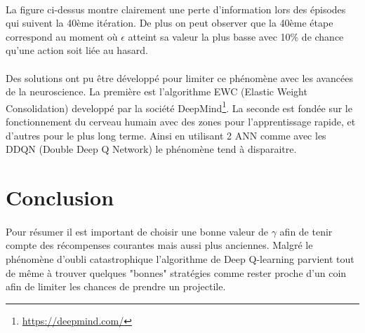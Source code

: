 \documentclass[12pt,oneside,a4paper]{article}
\begin{document}
    \paragraph{}
    La figure ci-dessus montre clairement une perte d'information lors des épisodes qui suivent la 40ème itération.
    De plus on peut observer que la 40ème étape correspond au moment où $\epsilon$ atteint sa valeur la plus basse
    avec 10\% de chance qu'une action soit liée au hasard.

    \paragraph{}
    Des solutions ont pu être développé pour limiter ce phénomène avec les avancées de la neuroscience. La première
    est l'algorithme EWC (Elastic Weight Consolidation) developpé par la société DeepMind\footnote{\url{https://deepmind.com/}}.
    La seconde est fondée sur le fonctionnement du cerveau humain avec des zones pour l'apprentissage rapide, et
    d'autres pour le plus long terme. Ainsi en utilisant 2 ANN comme avec les DDQN (Double Deep Q Network)
    le phénomène tend à disparaitre.


    \section{Conclusion}

    \paragraph{}
    Pour résumer il est important de choisir une bonne valeur de $\gamma$ afin de tenir compte des récompenses courantes
    mais aussi plus anciennes. Malgré le phénomène d'oubli catastrophique l'algorithme de Deep Q-learning parvient tout de même
    à trouver quelques "bonnes" stratégies comme rester proche d'un coin afin de limiter les chances de prendre un projectile.
\end{document}
